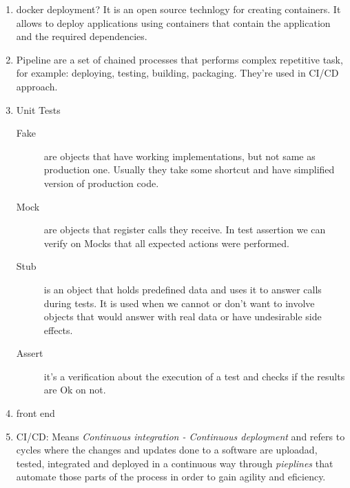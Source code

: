 \begin{multicols}{2}
\begin{enumerate}
\item docker deployment? It is an open source technlogy for creating containers. It allows to deploy applications using containers that contain the application and the required dependencies.
\item Pipeline are a set of chained processes that performs complex repetitive task, for example: deploying, testing, building, packaging. They're used in CI/CD approach.
\item Unit Tests
\begin{description}
\item[Fake] are objects that have working implementations, but not same as production one. Usually they take some shortcut and have simplified version of production code.
\item[Mock] are objects that register calls they receive.
In test assertion we can verify on Mocks that all expected actions were performed.
\item[Stub] is an object that holds predefined data and uses it to answer calls during tests. It is used when we cannot or don’t want to involve objects that would answer with real data or have undesirable side effects.
\item[Assert] it's a verification about the execution of a test and checks if the results are Ok on not.
\end{description}
\item front end
\item CI/CD: Means \emph{Continuous integration - Continuous deployment} and refers to cycles where the changes and updates done to a software are uploadad, tested, integrated and deployed in a continuous way through \emph{pieplines} that automate those parts of the process in order to gain agility and eficiency.
\end{enumerate}
\end{multicols}

